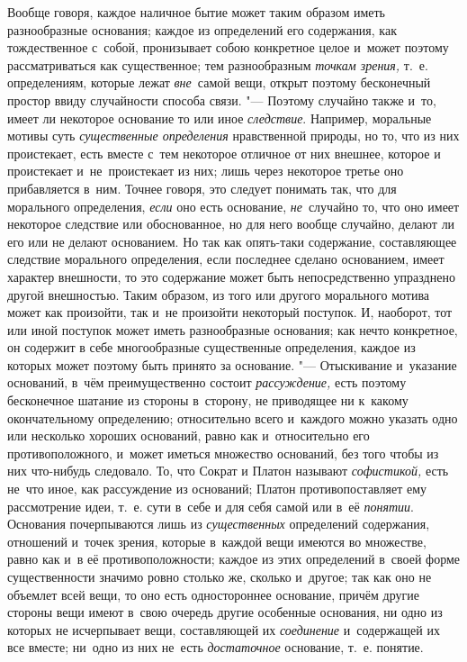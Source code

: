 Вообще говоря, каждое наличное бытие может таким образом иметь разнообразные
основания; каждое из определений его содержания, как тождественное с~собой,
пронизывает собою конкретное целое и~может поэтому рассматриваться как
существенное; тем разнообразным {\em точкам зрения,} т.~е. определениям,
которые лежат {\em вне}~самой вещи, открыт поэтому бесконечный простор ввиду
случайности способа связи. "--- Поэтому случайно также и~то, имеет ли некоторое
основание то или иное {\em следствие}. Например, моральные мотивы суть
{\em существенные определения} нравственной природы, но то, что из них
проистекает, есть вместе с~тем некоторое отличное от них внешнее, которое
и проистекает и~не~проистекает из них; лишь через некоторое третье оно
прибавляется в~ним. Точнее говоря, это следует понимать так, что для морального
определения, {\em если} оно есть основание, {\em не}~случайно то, что оно имеет
некоторое следствие или обоснованное, но для него вообще случайно, делают ли
его или не делают основанием. Но так как опять-таки содержание, составляющее
следствие морального определения, если последнее сделано основанием, имеет
характер внешности, то это содержание может быть непосредственно упразднено
другой внешностью. Таким образом, из того или другого морального мотива может
как произойти, так и~не произойти некоторый поступок. И, наоборот, тот или иной
поступок может иметь разнообразные основания; как нечто конкретное, он содержит
в себе многообразные существенные определения, каждое из которых может поэтому
быть принято за основание. "--- Отыскивание и~указание оснований, в~чём
преимущественно состоит {\em рассуждение,} есть поэтому бесконечное шатание из
стороны в~сторону, не приводящее ни к~какому окончательному определению;
относительно всего и~каждого можно указать одно или несколько хороших
оснований, равно как и~относительно его противоположного, и~может иметься
множество оснований, без того чтобы из них что-нибудь следовало. То, что Сократ
и Платон называют {\em софистикой,} есть не~что иное, как рассуждение из
оснований; Платон противопоставляет ему рассмотрение идеи, т.~е. сути в~себе и
для себя самой или в~её {\em понятии}. Основания почерпываются лишь из
{\em существенных} определений содержания, отношений и~точек зрения, которые
в~каждой вещи имеются во множестве, равно как и~в её противоположности; каждое
из этих определений в~своей форме существенности значимо ровно столько же,
сколько и~другое; так как оно не объемлет всей вещи, то оно есть одностороннее
основание, причём другие стороны вещи имеют в~свою очередь другие особенные
основания, ни одно из которых не исчерпывает вещи, составляющей их
{\em соединение} и~содержащей их все вместе; ни~одно из них не~есть
{\em достаточное} основание, т.~е. понятие.


